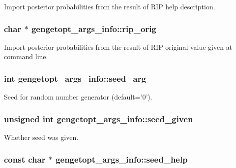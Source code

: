 Import posterior probabilities from the result of R\+I\+P help description. 

\hypertarget{structgengetopt__args__info_a152b3fd65570a82ac6effec4c8f78317}{
\subsubsection[{rip\+\_\+orig}]{\setlength{\rightskip}{0pt plus 5cm}char $\ast$ gengetopt\+\_\+args\+\_\+info\+::rip\+\_\+orig}}\label{structgengetopt__args__info_a152b3fd65570a82ac6effec4c8f78317}


Import posterior probabilities from the result of R\+I\+P original value given at command line. 

\hypertarget{structgengetopt__args__info_a607715b9c4184c391b4738d5f70512e7}{
\subsubsection[{seed\+\_\+arg}]{\setlength{\rightskip}{0pt plus 5cm}int gengetopt\+\_\+args\+\_\+info\+::seed\+\_\+arg}}\label{structgengetopt__args__info_a607715b9c4184c391b4738d5f70512e7}


Seed for random number generator (default='0'). 

\hypertarget{structgengetopt__args__info_a5628cfc09082e40b5e095f52c05098ac}{
\subsubsection[{seed\+\_\+given}]{\setlength{\rightskip}{0pt plus 5cm}unsigned int gengetopt\+\_\+args\+\_\+info\+::seed\+\_\+given}}\label{structgengetopt__args__info_a5628cfc09082e40b5e095f52c05098ac}


Whether seed was given. 

\hypertarget{structgengetopt__args__info_ab4344caee458766e8bb69c200668de97}{
\subsubsection[{seed\+\_\+help}]{\setlength{\rightskip}{0pt plus 5cm}const char $\ast$ gengetopt\+\_\+args\+\_\+info\+::seed\+\_\+help}}\label{structgengetopt__args__info_ab4344caee458766e8bb69c200668de97}


